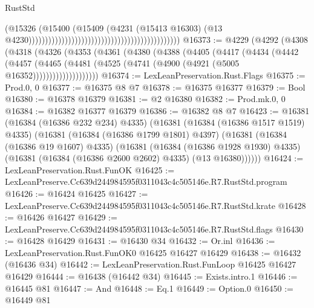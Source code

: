 \begin{lexlean}{RustStd}
\begin{coremodule}
                                                                                      (@15326
                                                                                        (@15400
                                                                                          (@15409
                                                                                            (@4231
                                                                                              (@15413
                                                                                                @16303)
                                                                                              (@13
                                                                                                @4230))))))))))))))))))))))))))))))))))))))))))))))
@16373 := @4229
    (@4292
      (@4308
        (@4318
          (@4326
            (@4353
              (@4361
                (@4380
                  (@4388
                    (@4405
                      (@4417
                        (@4434
                          (@4442
                            (@4457
                              (@4465
                                (@4481 (@4525 (@4741 (@4900 (@4921 (@5005 @16352))))))))))))))))))))
@16374 := LexLeanPreservation.Rust.Flags
@16375 := Prod.{0, 0}
@16377 := @16375 @8 @7
@16378 := @16375 @16377
@16379 := Bool
@16380 := @16378 @16379
@16381 := @2 @16380
@16382 := Prod.mk.{0, 0}
@16384 := @16382 @16377 @16379
@16386 := @16382 @8 @7
@16423 := @16381
    (@16384 (@16386 @232 @234) @4335)
    (@16381
      (@16384 (@16386 @1517 @1519) @4335)
      (@16381
        (@16384 (@16386 @1799 @1801) @4397)
        (@16381
          (@16384 (@16386 @19 @1607) @4335)
          (@16381
            (@16384 (@16386 @1928 @1930) @4335)
            (@16381 (@16384 (@16386 @2600 @2602) @4335) (@13 @16380))))))
@16424 := LexLeanPreservation.Rust.FunOK
@16425 := LexLeanPreserve.Cc639d244984595f0311043c4c505146e.R7.RustStd.program
@16426 := @16424 @16425
@16427 := LexLeanPreserve.Cc639d244984595f0311043c4c505146e.R7.RustStd.krate
@16428 := @16426 @16427
@16429 := LexLeanPreserve.Cc639d244984595f0311043c4c505146e.R7.RustStd.flags
@16430 := @16428 @16429
@16431 := @16430 @34
@16432 := Or.inl
@16436 := LexLeanPreservation.Rust.FunOK0 @16425 @16427 @16429
@16438 := @16432 (@16436 @34)
@16442 := LexLeanPreservation.Rust.FunLoop @16425 @16427 @16429
@16444 := @16438 (@16442 @34)
@16445 := Exists.intro.{1}
@16446 := @16445 @81
@16447 := And
@16448 := Eq.{1}
@16449 := Option.{0}
@16450 := @16449 @81

\end{coremodule}
\end{lexlean}
